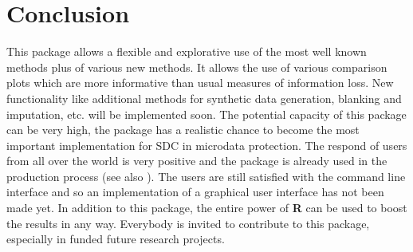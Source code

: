 \documentclass[12pt]{article}
\begin{document}



\section{Conclusion}

This package allows a flexible and explorative use of the most well known methods plus of various new methods. It allows the use of various comparison plots which are more informative than usual measures of information loss. New functionality like additional methods for synthetic data generation, blanking and imputation, etc. will be implemented soon. The potential capacity of this package can be very high, the  package has a realistic chance to become the most important implementation for SDC in microdata protection. The respond of users from all over the world is very positive and the package is already used in the production process (see also \cite{Meindl07}). The users are still satisfied with the command line interface and so an implementation of a graphical user interface has not been made yet. In addition to this package, the entire power of {\bf R} can be used to boost the results in any way. Everybody is invited to contribute to this package, especially in funded future research projects.
 
 
%

\footnotesize

\end{document}
